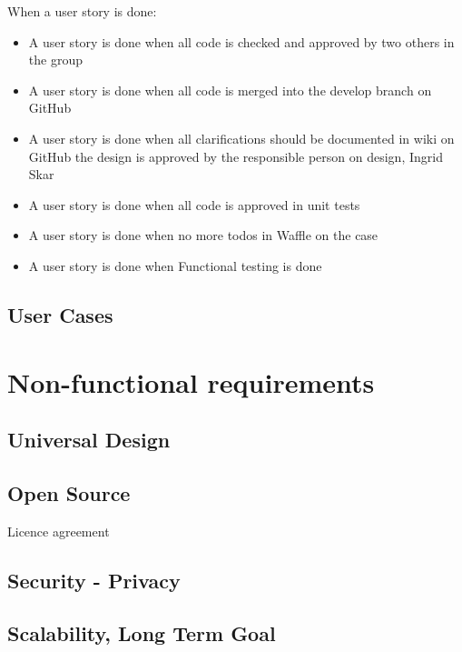 \begin{description}
    \item[When a user story is done:]
\end{description}
\begin{itemize}[noitemsep]
    \item A user story is done when all code is checked and approved by two others in the group
    \item A user story is done when all code is merged into the develop branch on GitHub
    \item A user story is done when all clarifications should be documented in wiki on GitHub
the design is approved by the responsible person on design, Ingrid Skar
    \item A user story is done when all code is approved in unit tests
    \item A user story is done when no more todos in Waffle on the case
    \item A user story is done when Functional testing is done
\end{itemize}


\subsection{User Cases}


\section{Non-functional requirements}
\subsection{Universal Design}

\subsection{Open Source}
Licence agreement

\subsection{Security - Privacy}

\subsection{Scalability, Long Term Goal}



\cleardoublepage